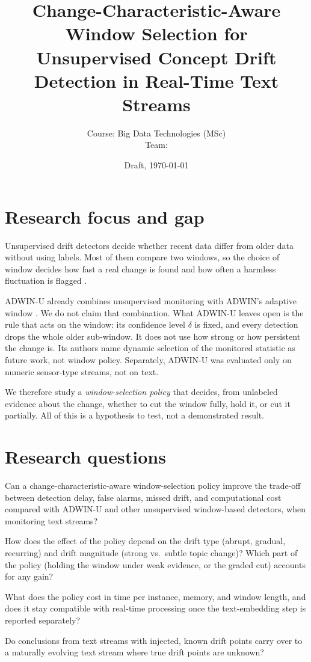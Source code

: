 \documentclass[11pt,a4paper]{article}
\title{Change-Characteristic-Aware Window Selection for\\
Unsupervised Concept Drift Detection in Real-Time Text Streams}
\author{Course: Big Data Technologies (MSc) \\ Team: \todo{names}}
\date{Draft, \today}
\begin{document}
\maketitle

\section{Research focus and gap}

Unsupervised drift detectors decide whether recent data differ from older data without using labels. Most of them compare two windows, so the choice of window decides how fast a real change is found and how often a harmless fluctuation is flagged \cite{hinder2024a,gowerwinter2026}.

ADWIN-U \cite{assis2025} already combines unsupervised monitoring with ADWIN's adaptive window \cite{bifet2007}. We do not claim that combination. What ADWIN-U leaves open is the rule that acts on the window: its confidence level $\delta$ is fixed, and every detection drops the whole older sub-window. It does not use how strong or how persistent the change is. Its authors name dynamic selection of the monitored statistic as future work, not window policy. Separately, ADWIN-U was evaluated only on numeric sensor-type streams, not on text.

We therefore study a \emph{window-selection policy} that decides, from unlabeled evidence about the change, whether to cut the window fully, hold it, or cut it partially. All of this is a hypothesis to test, not a demonstrated result.

\section{Research questions}

\begin{description}[leftmargin=0pt,labelindent=0pt,style=nextline]
\item[RQ1 (main).] Can a change-characteristic-aware window-selection policy improve the trade-off between detection delay, false alarms, missed drift, and computational cost compared with ADWIN-U and other unsupervised window-based detectors, when monitoring text streams?
\item[RQ2.] How does the effect of the policy depend on the drift type (abrupt, gradual, recurring) and drift magnitude (strong vs.\ subtle topic change)? Which part of the policy (holding the window under weak evidence, or the graded cut) accounts for any gain?
\item[RQ3.] What does the policy cost in time per instance, memory, and window length, and does it stay compatible with real-time processing once the text-embedding step is reported separately?
\item[RQ4.] Do conclusions from text streams with injected, known drift points carry over to a naturally evolving text stream where true drift points are unknown?
\end{description}
\end{document}
